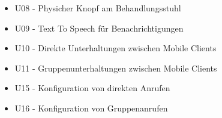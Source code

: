 \begin{itemize}
    \item U08 - Physicher Knopf am Behandlungsstuhl
    \item U09 - Text To Speech für Benachrichtigungen
    \item U10 - Direkte Unterhaltungen zwischen Mobile Clients
    \item U11 - Gruppenunterhaltungen zwischen Mobile Clients
    \item U15 - Konfiguration von direkten Anrufen
    \item U16 - Konfiguration von Gruppenanrufen
\end{itemize}
